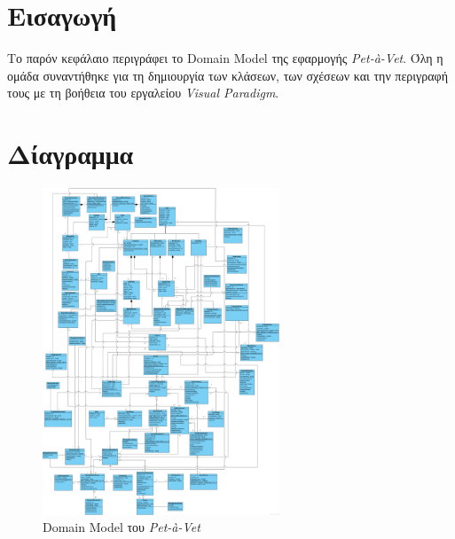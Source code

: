 \documentclass[12pt,a4paper,twoside]{book}
\begin{document}
\section{Εισαγωγή}
Το παρόν κεφάλαιο περιγράφει το Domain Model της εφαρμογής \textit{Pet-à-Vet}. Όλη η ομάδα συναντήθηκε για τη δημιουργία των κλάσεων, των σχέσεων και την περιγραφή τους με τη βοήθεια του εργαλείου \textit{Visual Paradigm}. %

\section{Δίαγραμμα}
\begin{figure}[H]
    \centering
    \includegraphics[width=0.63\textwidth]{Resources/Domain-model-v0.3.png}
    \caption{Domain Model του \textit{Pet-à-Vet}}\label{fig:domain_model}
\end{figure}
\end{document}
